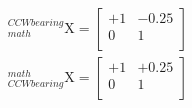 \documentclass[12pt,fleqn]{standalone}
\begin{document}
\begin{preview}
\Large
\[
\begin{aligned}
{\displaystyle _{math}^{CCW bearing}\textrm{X}=
\begin{bmatrix}
+1 & -0.25 \\
0 & 1 \\
\end{bmatrix}}\\
{\displaystyle _{CCW bearing}^{math}\textrm{X}=
\begin{bmatrix}
+1 & +0.25 \\
0 & 1 \\
\end{bmatrix}}\\
\end{aligned}
\]
\end{preview}
\end{document}
